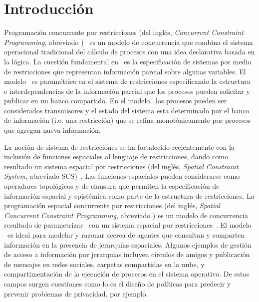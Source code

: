 
\chapter{Introducci\'on}
\label{cha.intro}

Programaci\'on concurrente por restricciones (del ingl\'es, \textit{Concurrent Constraint Programming}, abreviado \CCP)~\cite{DBLP:conf/popl/SaraswatR90,semantic-ccp,cp-book} es un modelo de concurrencia que combina el sistema operacional tradicional del c\'alculo de procesos con una idea declarativa basada en la l\'ogica. La cuesti\'on fundamental en \CCP \ es la especificaci\'on de sistemas por medio de restricciones que representan informaci\'on parcial sobre algunas variables. El modelo \CCP \ es param\'etrico en el sistema de restricciones especificando la estructura e interdependencias de la informaci\'on parcial que los procesos pueden solicitar y publicar en un banco compartido. En el modelo  \CCP \ los procesos pueden ser considerados transmisores y el estado del sistema esta determinado por el banco de informaci\'on (i.e. una restricci\'on) que se refina monot\'onicamente por procesos que agregan nueva informaci\'on.

La noci\'on de sistema de restricciones se ha fortalecido recientemente con la inclusi\'on de funciones espaciales al lenguaje de restricciones, dando como resultado un sistema espacial por restricciones (del ingl\'es, \textit{Spatial Constraint System}, abreviado SCS)~\cite{knight:hal-00761116}. Las funciones espaciales pueden considerarse como operadores topol\'ogicos y de clausura que permiten la especificaci\'on de informaci\'on espacial y epist\'emica como parte de la estructura de restricciones. La programaci\'on espacial concurrente por restricciones (del ingl\'es, \textit{Spatial Concurrent Constraint Programming}, abreviado \SCCP) es un modelo de concurrencia resultado de parametrizar \CCP \ con un sistema espacial por restricciones~\cite{knight:hal-00761116}. El modelo \SCCP \ es ideal para modelar y razonar acerca de agentes que consultan y comparten informaci\'on en la presencia de jerarqu\'ias espaciales. Algunos ejemplos de gesti\'on de acceso a informaci\'on por jerarquias incluyen c\'irculos de amigos y publicaci\'on de mensajes en redes sociales, carpetas compartidas en la nube, y compartimentaci\'on de la ejecuci\'on de procesos en el sistema operativo. De estos campos surgen cuestiones como lo es el dise\~no de pol\'iticas para predecir y prevenir problemas de privacidad, por ejemplo.

